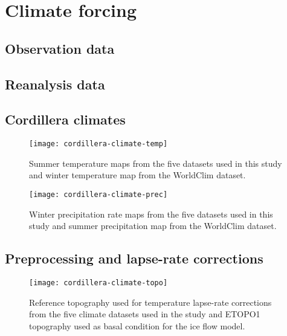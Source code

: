 
\section{Climate forcing}
\label{sec:climate}

\subsection{Observation data}


\subsection{Reanalysis data}


\subsection{Cordillera climates}

\begin{figure}[t]
	\vspace*{2mm}
	\begin{center}
		\texttt{[image: cordillera-climate-temp]}
	\end{center}
	\caption{Summer temperature maps from the five datasets used in this study and winter temperature map from the WorldClim dataset.}
	\label{fig:temp}
\end{figure}

\begin{figure}[t]
	\vspace*{2mm}
	\begin{center}
		\texttt{[image: cordillera-climate-prec]}
	\end{center}
	\caption{Winter precipitation rate maps from the five datasets used in this study and summer precipitation map from the WorldClim dataset.}
	\label{fig:prec}
\end{figure}


\subsection{Preprocessing and lapse-rate corrections}

\begin{figure}[t]
	\vspace*{2mm}
	\begin{center}
		\texttt{[image: cordillera-climate-topo]}
	\end{center}
	\caption{Reference topography used for temperature lapse-rate corrections from the five climate datasets used in the study and ETOPO1 topography used as basal condition for the ice flow model.}
	\label{fig:topo}
\end{figure}

